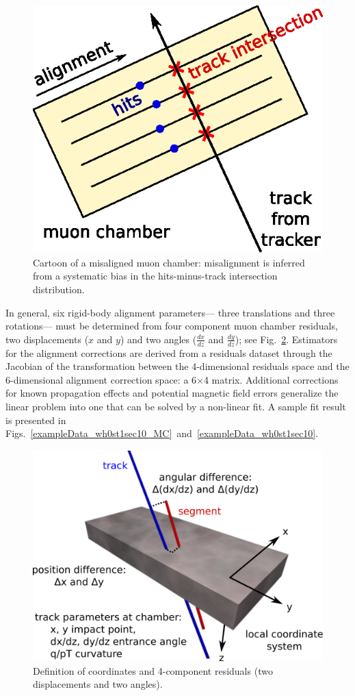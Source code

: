 \begin{figure}
\centering
\includegraphics[width=0.5\linewidth]{hip_explanation.eps}
\caption{Cartoon of a misaligned muon chamber: misalignment is inferred from a systematic bias in the hits-minus-track intersection distribution.} \label{hip_explanation}
\end{figure}

In general, six rigid-body alignment parameters--- three translations
and three rotations--- must be determined from four component muon
chamber residuals, two displacements ($x$ and $y$) and two angles
($\frac{dx}{dz}$ and $\frac{dy}{dz}$); see Fig.~\ref{dt_coordinates}.
Estimators for the alignment corrections are derived from a residuals
dataset through the Jacobian of the transformation between the
4-dimensional residuals space and the 6-dimensional alignment
correction space: a 6$\times$4 matrix.  Additional corrections for
known propagation effects and potential magnetic field errors
generalize the linear problem into one that can be solved by a
non-linear fit.  A sample fit result is presented in
Figs.~\ref{exampleData_wh0st1sec10_MC}~and~\ref{exampleData_wh0st1sec10}.

\begin{figure}
\centering
\includegraphics[width=\linewidth]{dt_coordinates.eps}
\caption{Definition of coordinates and 4-component residuals (two displacements and two angles).} \label{dt_coordinates}
\end{figure}

